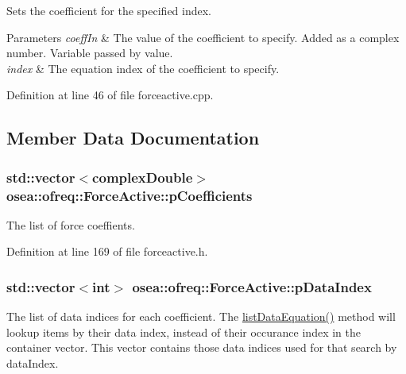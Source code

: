 Sets the coefficient for the specified index. 


\begin{DoxyParams}{Parameters}
{\em coeff\-In} & The value of the coefficient to specify. Added as a complex number. Variable passed by value. \\
\hline
{\em index} & The equation index of the coefficient to specify. \\
\hline
\end{DoxyParams}


Definition at line 46 of file forceactive.\-cpp.



\subsection{Member Data Documentation}
\hypertarget{classosea_1_1ofreq_1_1_force_active_af5731f3a699256f0b0b61b77701b236a}{
\subsubsection[{p\-Coefficients}]{\setlength{\rightskip}{0pt plus 5cm}std\-::vector$<${\bf complex\-Double}$>$ osea\-::ofreq\-::\-Force\-Active\-::p\-Coefficients\hspace{0.3cm}{\ttfamily [protected]}}}\label{classosea_1_1ofreq_1_1_force_active_af5731f3a699256f0b0b61b77701b236a}
The list of force coeffients. 

Definition at line 169 of file forceactive.\-h.

\hypertarget{classosea_1_1ofreq_1_1_force_active_a5fe90d49624efff55c2cc641f394f8f4}{
\subsubsection[{p\-Data\-Index}]{\setlength{\rightskip}{0pt plus 5cm}std\-::vector$<$int$>$ osea\-::ofreq\-::\-Force\-Active\-::p\-Data\-Index\hspace{0.3cm}{\ttfamily [protected]}}}\label{classosea_1_1ofreq_1_1_force_active_a5fe90d49624efff55c2cc641f394f8f4}


The list of data indices for each coefficient. The \hyperlink{classosea_1_1ofreq_1_1_force_active_a6c41c64d60a90442ab2caffcefe703f1}{list\-Data\-Equation()} method will lookup items by their data index, instead of their occurance index in the container vector. This vector contains those data indices used for that search by data\-Index. 



